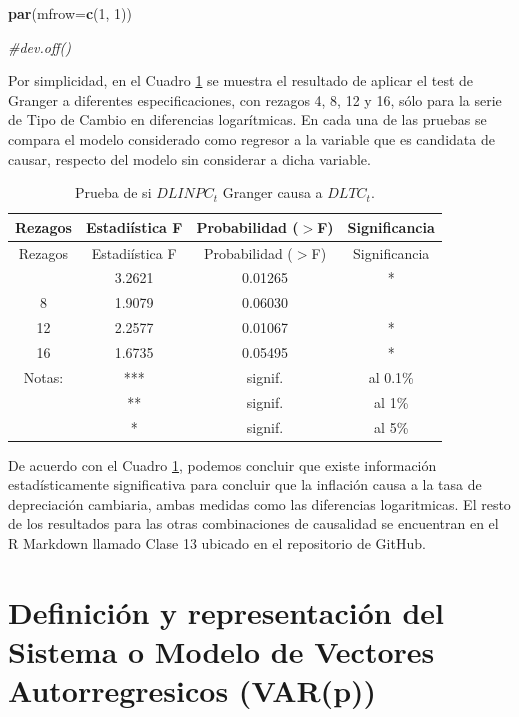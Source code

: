 \documentclass[
]{book}
\newenvironment{Shaded}{\begin{snugshade}}{\end{snugshade}}
\newcommand{\AttributeTok}[1]{\textcolor[rgb]{0.13,0.29,0.53}{#1}}
\newcommand{\CommentTok}[1]{\textcolor[rgb]{0.56,0.35,0.01}{\textit{#1}}}
\newcommand{\DecValTok}[1]{\textcolor[rgb]{0.00,0.00,0.81}{#1}}
\newcommand{\FunctionTok}[1]{\textcolor[rgb]{0.13,0.29,0.53}{\textbf{#1}}}
\newcommand{\NormalTok}[1]{#1}
\begin{document}
\begin{Shaded}
\begin{Highlighting}[]
\FunctionTok{par}\NormalTok{(}\AttributeTok{mfrow=}\FunctionTok{c}\NormalTok{(}\DecValTok{1}\NormalTok{, }\DecValTok{1}\NormalTok{))}

\CommentTok{\#dev.off()}
\end{Highlighting}
\end{Shaded}

Por simplicidad, en el Cuadro \ref{tab:Granger} se muestra el resultado de aplicar el test de Granger a diferentes especificaciones, con rezagos 4, 8, 12 y 16, sólo para la serie de Tipo de Cambio en diferencias logarítmicas. En cada una de las pruebas se compara el modelo considerado como regresor a la variable que es candidata de causar, respecto del modelo sin considerar a dicha variable.

\begin{longtable}[]{@{}cccc@{}}
\caption{\label{tab:Granger} Prueba de si \(DLINPC_t\) Granger causa a \(DLTC_t\).}\tabularnewline
\toprule\noalign{}
Rezagos & Estadiística F & Probabilidad (\(>\)F) & Significancia \\
\midrule\noalign{}
\endfirsthead
\toprule\noalign{}
Rezagos & Estadiística F & Probabilidad (\(>\)F) & Significancia \\
\midrule\noalign{}
\endhead
\bottomrule\noalign{}
\endlastfoot
4 & 3.2621 & 0.01265 & * \\
8 & 1.9079 & 0.06030 & \\
12 & 2.2577 & 0.01067 & * \\
16 & 1.6735 & 0.05495 & * \\
Notas: & *** & signif. & al 0.1\% \\
& ** & signif. & al 1\% \\
& * & signif. & al 5\% \\
\end{longtable}

De acuerdo con el Cuadro \ref{tab:Granger}, podemos concluir que existe información estadísticamente significativa para concluir que la inflación causa a la tasa de depreciación cambiaria, ambas medidas como las diferencias logaritmicas. El resto de los resultados para las otras combinaciones de causalidad se encuentran en el R Markdown llamado Clase 13 ubicado en el repositorio de GitHub.

\hypertarget{definiciuxf3n-y-representaciuxf3n-del-sistema-o-modelo-de-vectores-autorregresicos-varp}{%
\section{Definición y representación del Sistema o Modelo de Vectores Autorregresicos (VAR(p))}\label{definiciuxf3n-y-representaciuxf3n-del-sistema-o-modelo-de-vectores-autorregresicos-varp}}
\end{document}

